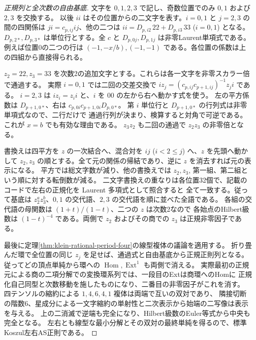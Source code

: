 \begin{proof}[正規列と全次数の自由基底]
文字を $0,1,2,3$ で記し、奇数位置でのみ $0,1$ および $2,3$ を交換する。
以後 $ii$ はその位置からの二文字を表す。$i=0,1$ と $j=2,3$ の間の四関係は
$ji=c_{p,ij}ij$、他の二つは $ii=D_{p,i2}\,22+D_{p,i3}\,33$ ($i=0,1$) となる。
$D_{p,2*},D_{p,3*}$ は単位行とする。全 $c$ と $D_{p,0j},D_{p,1j}$ は非零Laurent単項式である。
例えば位置0の二つの行は $(-1,-x/b),(-1,-1)$ である。各位置の係数は上の四組から直接得られる。

$z_2=22,z_3=33$ を次数2の追加文字とする。これらは各一文字を非零スカラー倍で通過する。
実際 $i=0,1$ では二回の交差交換で $i z_j=(c_{p,ij}c_{p+1,ij})^{-1}z_j i$ である。
$i=2,3$ は $i z_i=z_i i$ と、$i$ を $00$ の左から右へ動かす式を使う。
左の平方係数は $D_{p+1,0*}$、右は $c_{p,0i}c_{p+1,0i}D_{p,0*}$。
第 $i$ 単位行と $D_{p+1,0*}$ の行列式は非零単項式なので、二行だけで
通過行列が決まり、検算すると対角で可逆である。これが $x=b$ でも有効な理由である。
$z_3 z_2$ も二回の通過で $z_2 z_3$ の非零倍となる。

書換えは四平方を $z$ の一次結合へ、混合対を $ij$ ($i<2\le j$) へ、$z$ を先頭へ動かして
$z_2,z_3$ の順とする。全て元の関係の帰結であり、逆に $z$ を消去すれば元の表示になる。
平方では総文字数が減り、他の書換えでは $z_2,z_3$, 第一組、第二組という順に対する転倒数が減る。
二文字書換えの重なりは各位置32個で、記載のコードで左右の正規化を Laurent 多項式として照合すると
全て一致する。従って基底は $z_2^a z_3^b$、$0,1$ の交代語、$2,3$ の交代語を順に並べた全語である。
各組の交代語の母関数は $(1+t)/(1-t)$、二つの $z$ は次数2なので
各始点のHilbert級数は $(1-t)^{-4}$ である。両側で $z_2$ およびその商での $z_3$ は正規非零因子である。

最後に定理\ref{thm:klein-rational-period-four}の線型複体の議論を適用する。
折り畳んだ環で全位置の同じ $z_j$ を足せば、通過式と自由基底から正規正則列となる。
従ってどの頂点単純から環への $\operatorname{Hom},\operatorname{Ext}^1$ も両側で消える。
実際最初の正規元による商の二項分解での変換環系列では、一段目のExtは商環へのHomに
正規化自己同型と次数移動を施したものになり、二番目の非零因子がこれを消す。
四テンソルの縮約による $1,4,6,4,1$ 複体は両端で互いの双対であり、
隣接切断の階数6、星成分による一文字縮約の単射性と二次表示から始端の二写像は表示を与える。
上の二消滅で逆端も完全になり、Hilbert級数のEuler等式から中央も完全となる。
左右とも線型な最小分解とその双対の最終単純を得るので、標準Koszul左右AS正則である。
\end{proof}
